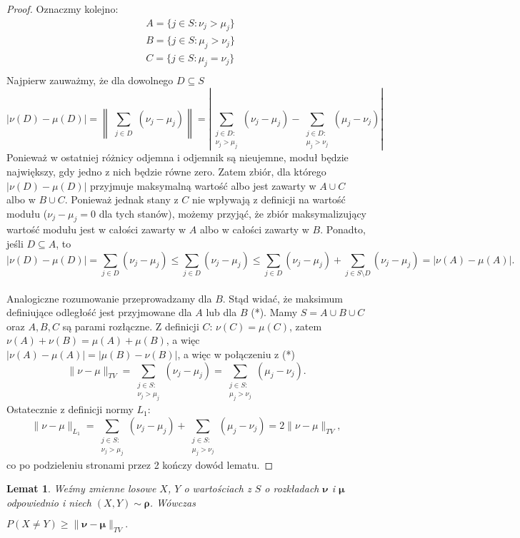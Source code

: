 \documentclass[a4paper]{article}
\theoremstyle{defn}
\theoremstyle{theorem}
\theoremstyle{lemma}
\newtheorem{lemma}[defn]{Lemat}
\theoremstyle{cor}
\theoremstyle{fact}
\begin{document}
\begin{proof}
Oznaczmy kolejno: \begin{align*}
&A = \{j \in S: \nu_j > \mu_j\}\\
&B = \{j \in S: \mu_j > \nu_j\}\\
&C = \{j \in S: \mu_j = \nu_j\}\\
\end{align*}
Najpierw zauważmy, że dla dowolnego $D \subseteq S$ $$|\nu(D) - \mu(D)| =  \left\| \sum\limits_{\substack{j \in D}} (\nu_j - \mu_j) \right\| =  \left\lvert \sum\limits_{\substack{j \in D:\\ \nu_j > \mu_j}} (\nu_j - \mu_j) - \sum\limits_{\substack{j \in D:\\ \mu_j > \nu_j}} (\mu_j - \nu_j) \right\rvert$$
Ponieważ w ostatniej różnicy odjemna i odjemnik są nieujemne, moduł będzie największy, gdy jedno z nich będzie równe zero. Zatem zbiór, dla którego $|\nu(D) - \mu(D)|$ przyjmuje maksymalną wartość albo jest zawarty w $A \cup C$ albo w $B \cup C$. Ponieważ jednak stany z $C$ nie wpływają z definicji na wartość modułu ($\nu_j - \mu_j = 0$ dla tych stanów), możemy przyjąć, że zbiór maksymalizujący wartość modułu jest w całości zawarty w $A$ albo w całości zawarty w $B$. Ponadto, jeśli $D \subseteq A$, to $$|\nu(D) - \mu(D)| = \sum\limits_{j \in D} (\nu_j - \mu_j) \leq \sum\limits_{j \in D} (\nu_j - \mu_j) \leq \sum\limits_{j \in D} (\nu_j - \mu_j) + \sum\limits_{j \in S \setminus D} (\nu_j - \mu_j) = |\nu(A) - \mu(A)|.$$\\
Analogiczne rozumowanie przeprowadzamy dla $B$. Stąd widać, że maksimum definiujące odległość jest przyjmowane dla $A$ lub dla $B$ (*). Mamy $S = A \cup B \cup C$ oraz $A, B, C$ są parami rozłączne. Z definicji $C$: $\nu(C) = \mu(C)$, zatem $\nu(A) + \nu(B) = \mu(A) + \mu(B)$, a więc $|\nu(A) - \mu(A)| = |\mu(B) - \nu(B)|$, a więc w połączeniu z (*) $$\|\nu - \mu\|_{TV} = \sum\limits_{\substack{j \in S:\\ \nu_j > \mu_j}} (\nu_j - \mu_j) = \sum\limits_{\substack{j \in S:\\ \mu_j > \nu_j}} (\mu_j - \nu_j).$$
Ostatecznie z definicji normy $L_1$:
$$\|\nu - \mu\|_{L_1} = \sum\limits_{\substack{j \in S:\\ \nu_j > \mu_j}} (\nu_j - \mu_j) + \sum\limits_{\substack{j \in S:\\ \mu_j > \nu_j}} (\mu_j - \nu_j) = 2\|\nu - \mu\|_{TV},$$
co po podzieleniu stronami przez 2 kończy dowód lematu.
\end{proof}
\begin{lemma}\label{lemma2.4.4}
Weźmy zmienne losowe $X$, $Y$ o wartościach z $S$ o rozkładach $\boldsymbol{\nu}$ i $\boldsymbol{\mu}$ odpowiednio i niech $(X, Y) \sim \boldsymbol{\rho}$. Wówczas
\begin{center}
$P(X \neq Y) \geq \|\boldsymbol{\nu} - \boldsymbol{\mu}\|_{TV}.$
\end{center}
\end{lemma}
\end{document}
